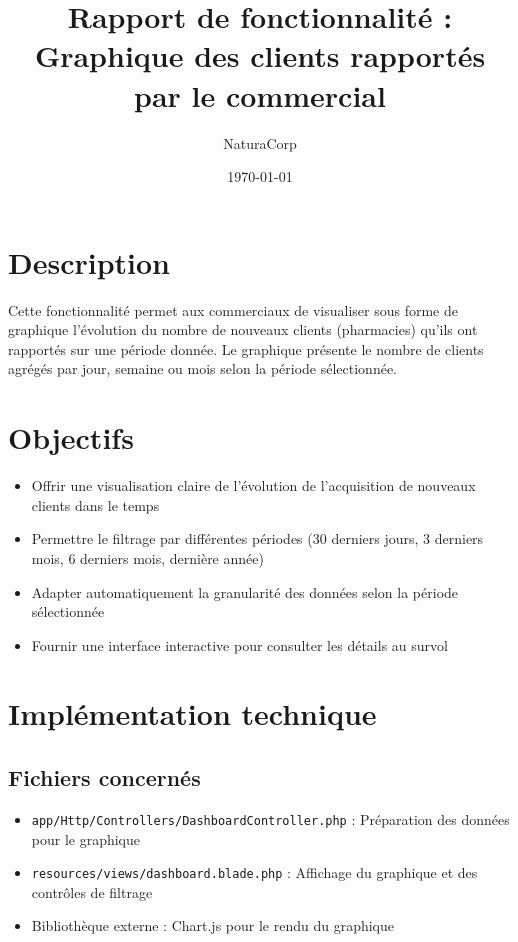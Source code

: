 \documentclass[12pt,a4paper]{article}
\title{Rapport de fonctionnalité : Graphique des clients rapportés par le commercial}
\author{NaturaCorp}
\date{\today}
\begin{document}
\maketitle

\section{Description}
Cette fonctionnalité permet aux commerciaux de visualiser sous forme de graphique l'évolution du nombre de nouveaux clients (pharmacies) qu'ils ont rapportés sur une période donnée. Le graphique présente le nombre de clients agrégés par jour, semaine ou mois selon la période sélectionnée.

\section{Objectifs}
\begin{itemize}
    \item Offrir une visualisation claire de l'évolution de l'acquisition de nouveaux clients dans le temps
    \item Permettre le filtrage par différentes périodes (30 derniers jours, 3 derniers mois, 6 derniers mois, dernière année)
    \item Adapter automatiquement la granularité des données selon la période sélectionnée
    \item Fournir une interface interactive pour consulter les détails au survol
\end{itemize}

\section{Implémentation technique}

\subsection{Fichiers concernés}
\begin{itemize}
    \item \texttt{app/Http/Controllers/DashboardController.php} : Préparation des données pour le graphique
    \item \texttt{resources/views/dashboard.blade.php} : Affichage du graphique et des contrôles de filtrage
    \item Bibliothèque externe : Chart.js pour le rendu du graphique
\end{itemize}
\end{document}
